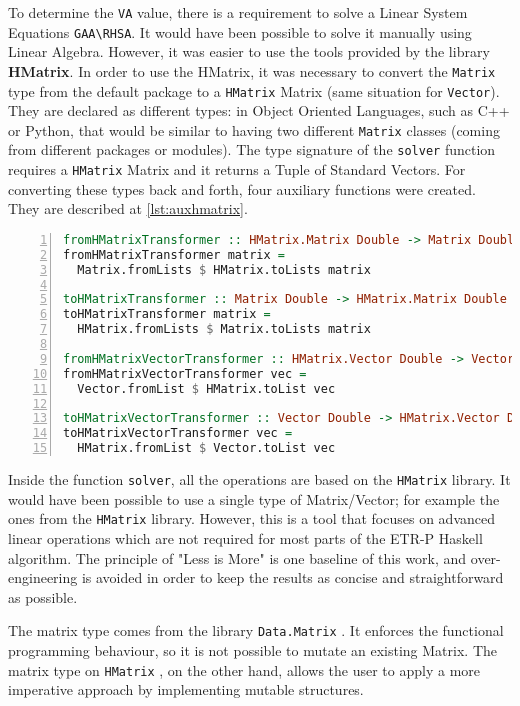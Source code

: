 To determine the \lstinline!VA! value, there is a requirement to solve a Linear System Equations \lstinline!GAA\RHSA!. It would have been possible to solve it manually using Linear Algebra. However, it was easier to use the tools provided by the library \textbf{HMatrix}. In order to use the HMatrix, it was necessary to convert the \lstinline!Matrix! type from the default package to a \lstinline!HMatrix! Matrix (same situation for \lstinline!Vector!). They are declared as different types: in Object Oriented Languages, such as C++ or Python, that would be similar to having two different \lstinline!Matrix! classes (coming from different packages or modules). The type signature of the \lstinline!solver! function requires a \lstinline!HMatrix! Matrix and it returns a Tuple of Standard Vectors. For converting these types back and forth, four auxiliary functions were created. They are described at \cref{lst:auxhmatrix}.

\begin{lstlisting}[language=Haskell, numbers=left, caption={Converting between Matrices and Vectors - HMatrix and standard types}, captionpos=b, label={lst:auxhmatrix}]
fromHMatrixTransformer :: HMatrix.Matrix Double -> Matrix Double
fromHMatrixTransformer matrix =
  Matrix.fromLists $ HMatrix.toLists matrix

toHMatrixTransformer :: Matrix Double -> HMatrix.Matrix Double
toHMatrixTransformer matrix =
  HMatrix.fromLists $ Matrix.toLists matrix

fromHMatrixVectorTransformer :: HMatrix.Vector Double -> Vector Double
fromHMatrixVectorTransformer vec =
  Vector.fromList $ HMatrix.toList vec

toHMatrixVectorTransformer :: Vector Double -> HMatrix.Vector Double
toHMatrixVectorTransformer vec =
  HMatrix.fromList $ Vector.toList vec
\end{lstlisting}

Inside the function \lstinline!solver!, all the operations are based on the \lstinline!HMatrix! library. It would have been possible to use a single type of Matrix/Vector; for example the ones from the \lstinline!HMatrix! library. However, this is a tool that focuses on advanced linear operations which are not required for most parts of the ETR-P Haskell algorithm. The principle of "Less is More" is one baseline of this work, and over-engineering is avoided in order to keep the results as concise and straightforward as possible.


The matrix type comes from the library \lstinline!Data.Matrix! \cite{datamatrix}. It enforces the functional programming behaviour, so it is not possible to mutate an existing Matrix. The matrix type on \lstinline!HMatrix! \cite{hmatrix}, on the other hand, allows the user to apply a more imperative approach by implementing mutable structures.  

